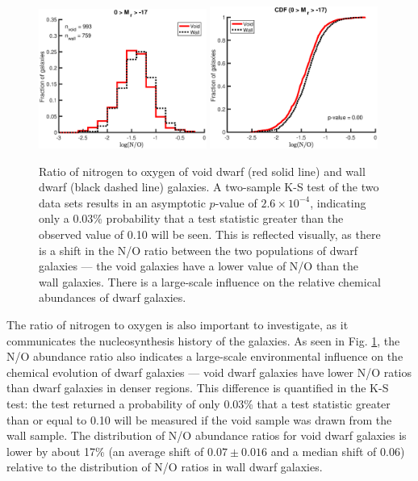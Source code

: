 \begin{figure}
    \centering
    \includegraphics[width=0.49\textwidth]{Images/Paper3/1sig_dwarf_SF_t3_logNOrelations_dust_hist}
    \includegraphics[width=0.49\textwidth]{Images/Paper3/1sig_dwarf_SF_t3_logNOrelations_dust_CDF}
    \caption[N/O distribution of dwarf galaxy sample]{Ratio of nitrogen to 
    oxygen of void dwarf (red solid line) and wall dwarf (black dashed line) 
    galaxies.  A two-sample K-S test of the two data sets results in an 
    asymptotic $p$-value of $2.6\times 10^{-4}$, indicating only a 0.03\% 
    probability that a test statistic greater than the observed value of 0.10 
    will be seen.  This is reflected visually, as there is a shift in the N/O 
    ratio between the two populations of dwarf galaxies --- the void galaxies 
    have a lower value of N/O than the wall galaxies.  There is a large-scale 
    influence on the relative chemical abundances of dwarf galaxies.}
    \label{fig:NOratio_P3}
\end{figure}

The ratio of nitrogen to oxygen is also important to investigate, as it 
communicates the nucleosynthesis history of the galaxies.  As seen in Fig. 
\ref{fig:NOratio_P3}, the N/O abundance ratio also indicates a large-scale 
environmental influence on the chemical evolution of dwarf galaxies --- void 
dwarf galaxies have lower N/O ratios than dwarf galaxies in denser regions.  
This difference is quantified in the K-S test: the test returned a probability of 
only 0.03\% that a test statistic greater than or equal to 0.10 will be measured 
if the void sample was drawn from the wall sample.  The distribution of N/O 
abundance ratios for void dwarf galaxies is lower by about 17\% (an average 
shift of $0.07\pm 0.016$ and a median shift of 0.06) relative to the 
distribution of N/O ratios in wall dwarf galaxies.


